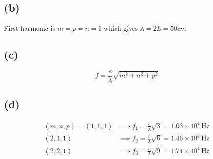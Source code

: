 \documentclass[a4paper]{article}
\begin{document}
\subsection*{(b)} 
First harmonic is $m = p = n = 1$ which gives $\lambda = 2L = 50 cm$

\subsection*{(c)} 
\[
f= \frac{c}{\lambda} \sqrt{m^2 + n^2 + p^2} 
\] 

\subsection*{(d)} 
\begin{align*}
	(m,n,p ) = (1,1,1) &\implies f_1 = \frac{c}{\lambda} \sqrt{3}  = 1.03 \times 10^{4} \, \text{Hz} \\ 
	(2,1,1) &\implies f_2 = \frac{c}{\lambda} \sqrt{6}  = 1.46 \times 10^{4} \, \text{Hz} \\ 
	(2,2,1) &\implies f_3 = \frac{c}{\lambda} \sqrt{9}  = 1.74 \times 10^{4} \, \text{Hz}
\end{align*}
\end{document}
